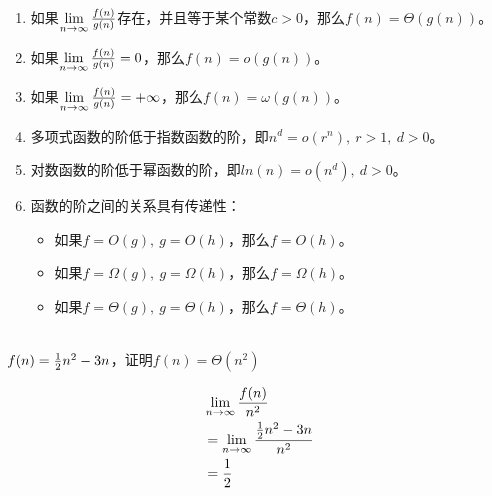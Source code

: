 \begin{enumerate}
	\item 如果$ \lim\limits_{n \rightarrow \infty} {f(n) \over g(n)} $存在，并且等于某个常数$ c > 0 $，那么$ f(n) = \Theta(g(n)) $。

	\item 如果$ \lim\limits_{n \rightarrow \infty} {f(n) \over g(n)} = 0 $，那么$ f(n) = o(g(n)) $。

	\item 如果$ \lim\limits_{n \rightarrow \infty} {f(n) \over g(n)} = +\infty $，那么$ f(n) = \omega(g(n)) $。

	\item 多项式函数的阶低于指数函数的阶，即$ n^d = o(r^n),\ r > 1,\ d > 0 $。

	\item 对数函数的阶低于幂函数的阶，即$ ln(n) = o(n^d),\ d > 0 $。

	\item 函数的阶之间的关系具有传递性：
	      \begin{itemize}
		      \item 如果$ f = O(g),\ g = O(h) $，那么$ f = O(h) $。

		      \item 如果$ f = \Omega(g),\ g = \Omega(h) $，那么$ f = \Omega(h) $。

		      \item 如果$ f = \Theta(g),\ g = \Theta(h) $，那么$ f = \Theta(h) $。
	      \end{itemize}
\end{enumerate}

\vspace{0.5cm}

\\

$ f(n) = {1 \over 2}n^2 - 3n $，证明$ f(n) = \Theta(n^2) $

\vspace{-0.5cm}

\begin{align*}
	 & \lim\limits_{n \rightarrow \infty} {f(n) \over n^2}                  \\
	 & = \lim\limits_{n \rightarrow \infty} {{1 \over 2}n^2 - 3n \over n^2} \\
	 & = {1 \over 2}
\end{align*}

\vspace{0.5cm}

\\

